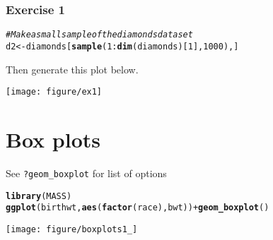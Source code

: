 \documentclass{beamer}\usepackage[]{graphicx}\usepackage[]{color}
\makeatletter
\newcommand{\hlcom}[1]{\textcolor[rgb]{0.678,0.584,0.686}{\textit{#1}}}%
\newcommand{\hlkwd}[1]{\textcolor[rgb]{0.737,0.353,0.396}{\textbf{#1}}}%
\newenvironment{kframe}{%
 \def\at@end@of@kframe{}%
 \ifinner\ifhmode%
  \def\at@end@of@kframe{\end{minipage}}%
  \begin{minipage}{\columnwidth}%
 \fi\fi%
 \def\FrameCommand##1{\hskip\@totalleftmargin \hskip-\fboxsep
 \colorbox{shadecolor}{##1}\hskip-\fboxsep
     \hskip-\linewidth \hskip-\@totalleftmargin \hskip\columnwidth}%
 \MakeFramed {\advance\hsize-\width
   \@totalleftmargin\z@ \linewidth\hsize
   \@setminipage}}%
 {\par\unskip\endMakeFramed%
 \at@end@of@kframe}
\newenvironment{knitrout}{}{} %
\makeatother
\begin{document}
\begin{frame}[fragile]
\frametitle{Exercise 1}
\begin{knitrout}\footnotesize
{}\color{fgcolor}\begin{kframe}
\begin{alltt}
\hlcom{# Make a small sample of the diamonds dataset}
d2 <- diamonds[\hlkwd{sample}(1:\hlkwd{dim}(diamonds)[1], 1000), ]
\end{alltt}
\end{kframe}
\end{knitrout}

Then generate this plot below.

\begin{knitrout}\footnotesize
{}\color{fgcolor}

{\centering \texttt{[image: figure/ex1]} 

}



\end{knitrout}

\end{frame}
\section*{Box plots}
\frame{\sectionpage}

\begin{frame}[fragile]
See \texttt{?geom\_boxplot} for list of options
\begin{knitrout}\footnotesize
{}\color{fgcolor}\begin{kframe}
\begin{alltt}
\hlkwd{library}(MASS)
\hlkwd{ggplot}(birthwt, \hlkwd{aes}(\hlkwd{factor}(race), bwt)) + \hlkwd{geom_boxplot}()
\end{alltt}
\end{kframe}

{\centering \texttt{[image: figure/boxplots1\_]} 

}



\end{knitrout}

\end{frame}
\end{document}

